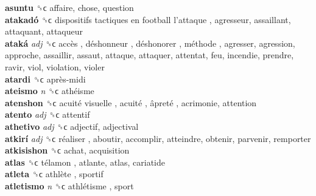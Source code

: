 \textbf{asuntu} ␝ϲ  affaire, chose, question  \\
\textbf{atakadó} ␝ϲ   dispositifs tactiques en football l’attaque , agresseur, assaillant, attaquant, attaqueur  \\
\textbf{ataká} \emph{adj}  ␝ϲ   accès ,  déshonneur ,  déshonorer ,  méthode , agresser, agression, approche, assaillir, assaut, attaque, attaquer, attentat, feu, incendie, prendre, ravir, viol, violation, violer  \\
\textbf{atardi} ␝ϲ   après-midi   \\
\textbf{ateismo} \emph{n}  ␝ϲ   athéisme   \\
\textbf{atenshon} ␝ϲ   acuité visuelle ,  acuité ,  âpreté , acrimonie, attention  \\
\textbf{atento} \emph{adj}  ␝ϲ  attentif  \\
\textbf{athetivo} \emph{adj}  ␝ϲ  adjectif, adjectival  \\
\textbf{atkirí} \emph{adj}  ␝ϲ   réaliser , aboutir, accomplir, atteindre, obtenir, parvenir, remporter  \\
\textbf{atkisishon} ␝ϲ  achat, acquisition  \\
\textbf{atlas} ␝ϲ   télamon , atlante, atlas, cariatide  \\
\textbf{atleta} ␝ϲ   athlète , sportif  \\
\textbf{atletismo} \emph{n}  ␝ϲ   athlétisme , sport  \\

